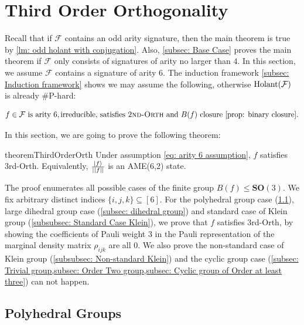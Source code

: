\section{Third Order Orthogonality}\label{sec: Third Order Orth}
Recall that if $\mathcal{F}$ contains an odd arity signature, then the main theorem is true by \cref{lm: odd holant with conjugation}.
Also, \cref{subsec: Base Case} proves the main theorem if $\mathcal{F}$ only consists of signatures of arity no larger than $4$.
In this section, we assume $\mathcal{F}$ contains a signature of arity $6$.
The induction framework \cref{subsec: Induction framework} shows we may assume the following, otherwise $\operatorname{Holant}(\mathcal{F})$ is already \#P-hard:

\begin{equation}\label{eq: arity 6 assumption}
    f\in \mathcal{F} \text{ is arity } 6, \text{irreducible, satisfies {\sc 2nd-Orth} and } B(f) \text{ closure \cref{prop: binary closure}.}
\end{equation}

In this section, we are going to prove the following theorem:

\begin{restatable}{theorem}{ThirdOrderOrth}\label{thm: third order orthogonality}
    Under assumption \eqref{eq: arity 6 assumption}, $f$ satisfies {\sc 3rd-Orth}.
    Equivalently, $\frac{\ket{f}}{||f||}$ is an AME(6,2) state.
\end{restatable}

The proof enumerates all possible cases of the finite group $B(f)\le \mathbf{SO}(3)$.
We fix arbitrary distinct indices $\{i,j,k\}\subseteq [6]$.
For the polyhedral group case (\cref{subsec: polyhedral groups}), large dihedral group case (\cref{subsec: dihedral group}) and standard case of Klein group (\cref{subsubsec: Standard Case Klein}), we prove that $f$ satisfies {\sc 3rd-Orth}, by showing the coefficients of Pauli weight $3$ in the Pauli representation of the marginal density matrix $\rho_{ijk}$ are all 0. 
We also prove the non-standard case of Klein group (\cref{subsubsec: Non-standard Klein}) and the cyclic group case (\cref{subsec: Trivial group,subsec: Order Two group,subsec: Cyclic group of Order at least three}) can not happen.


\subsection{Polyhedral Groups}\label{subsec: polyhedral groups}

